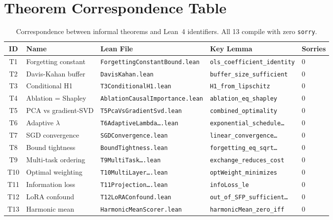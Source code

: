 \documentclass[11pt,a4paper]{article}
\theoremstyle{definition}
\begin{document}
\appendix

\section{Theorem Correspondence Table}
\label{app:table}

\begin{table}[h]
\centering
\footnotesize
\begin{tabular}{@{}cllll@{}}
\toprule
\textbf{ID} & \textbf{Name} & \textbf{Lean File} & \textbf{Key Lemma} & \textbf{Sorries} \\
\midrule
T1 & Forgetting constant & \texttt{ForgettingConstantBound.lean} & \texttt{ols\_coefficient\_identity} & 0 \\
T2 & Davis-Kahan buffer & \texttt{DavisKahan.lean} & \texttt{buffer\_size\_sufficient} & 0 \\
T3 & Conditional H1 & \texttt{T3ConditionalH1.lean} & \texttt{H1\_from\_lipschitz} & 0 \\
T4 & Ablation = Shapley & \texttt{AblationCausalImportance.lean} & \texttt{ablation\_eq\_shapley} & 0 \\
T5 & PCA vs gradient-SVD & \texttt{T5PcaVsGradientSvd.lean} & \texttt{combined\_optimality} & 0 \\
T6 & Adaptive $\lambda$ & \texttt{T6AdaptiveLambda\ldots.lean} & \texttt{exponential\_schedule\ldots} & 0 \\
T7 & SGD convergence & \texttt{SGDConvergence.lean} & \texttt{linear\_convergence\ldots} & 0 \\
T8 & Bound tightness & \texttt{BoundTightness.lean} & \texttt{forgetting\_eq\_sqrt\ldots} & 0 \\
T9 & Multi-task ordering & \texttt{T9MultiTask\ldots.lean} & \texttt{exchange\_reduces\_cost} & 0 \\
T10 & Optimal weighting & \texttt{T10MultiLayer\ldots.lean} & \texttt{optWeight\_minimizes} & 0 \\
T11 & Information loss & \texttt{T11Projection\ldots.lean} & \texttt{infoLoss\_le} & 0 \\
T12 & LoRA confound & \texttt{T12LoRAConfound.lean} & \texttt{out\_of\_SFP\_sufficient\ldots} & 0 \\
T13 & Harmonic mean & \texttt{HarmonicMeanScorer.lean} & \texttt{harmonicMean\_zero\_iff} & 0 \\
\bottomrule
\end{tabular}
\caption{Correspondence between informal theorems and Lean~4 identifiers. All 13 compile with zero \texttt{sorry}.}
\label{tab:correspondence}
\end{table}
\end{document}
